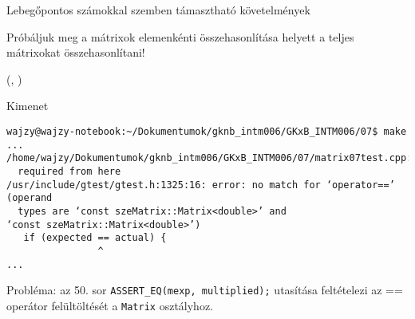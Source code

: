 \documentclass[usenames,dvipsnames,aspectratio=169]{beamer}
\begin{document}
\begin{frame}
  \begin{center}
    Lebegőpontos számokkal szemben támasztható követelmények
    \medskip\\
  \end{center}
\end{frame}

\begin{frame}
  Próbáljuk meg a mátrixok elemenkénti összehasonlítása helyett a teljes mátrixokat összehasonlítani!
  \begin{exampleblock}{ %
    (, %
     )}
    \scriptsize
    
  \end{exampleblock}
\end{frame}

\begin{frame}
  \begin{exampleblock}{}
    
  \end{exampleblock}
\end{frame}

\begin{frame}[fragile]
  \begin{block}{Kimenet}
    \footnotesize
    \begin{verbatim}
wajzy@wajzy-notebook:~/Dokumentumok/gknb_intm006/GKxB_INTM006/07$ make
...
/home/wajzy/Dokumentumok/gknb_intm006/GKxB_INTM006/07/matrix07test.cpp:50:3: 
  required from here
/usr/include/gtest/gtest.h:1325:16: error: no match for ‘operator==’ (operand 
  types are ‘const szeMatrix::Matrix<double>’ and 
‘const szeMatrix::Matrix<double>’)
   if (expected == actual) {
                ^
...
\end{verbatim}
  \end{block}
  \vfill
  Probléma: az 50. sor \texttt{ASSERT\_EQ(mexp, multiplied);} utasítása feltételezi az == operátor felültöltését a 
\texttt{Matrix} osztályhoz.
\end{frame}
\end{document}

